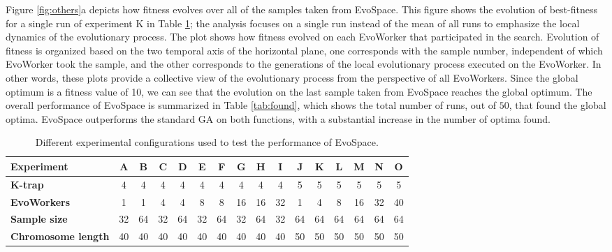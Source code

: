 Figure \ref{fig:others}a depicts how fitness evolves over all of the samples taken from EvoSpace.
This figure shows the evolution of best-fitness for a single run of experiment K in Table \ref{tab:exp};
the analysis focuses on a single run instead of the mean of all runs to emphasize the local dynamics of the evolutionary process.
The plot shows how fitness evolved on each EvoWorker that participated in the search.
Evolution of fitness is organized based on the two temporal axis of the horizontal plane,
one corresponds with the sample number, independent of which EvoWorker took the sample, and the other corresponds
to the generations of the local evolutionary process executed on the EvoWorker.
In other words, these plots provide a collective view of the evolutionary process from the perspective of all EvoWorkers.
Since the global optimum is a fitness value of 10, we can see that the evolution on the last sample taken from EvoSpace reaches the global optimum.
The overall performance of EvoSpace is summarized in Table \ref{tab:found}, which shows the total number of runs, out of $50$,
that found the global optima.
EvoSpace outperforms the standard GA on both functions, with a substantial increase in the number of optima found.

\begin{table}[t]
\caption{Different experimental configurations used to test the
  performance of EvoSpace.} %
\centering
\tiny
\begin{tabular}{|l||c|c|c|c|c|c|c|c|c|c|c|c|c|c|c|}
   \hline
             \textbf{Experiment} 	& A & B & C & D & E & F & G & H & I & J & K & L & M & N & O \\

   \hline
               \textbf{K-trap}   	& 4  & 4  & 4  & 4  & 4  & 4  & 4  & 4  & 4 & 5 & 5 & 5 & 5 & 5 & 5 \\
			   \textbf{EvoWorkers}  & 1  & 1  & 4  & 4  & 8  & 8  & 16 & 16 & 32 & 1 & 4 & 8 & 16 & 32 & 40 \\
			   \textbf{Sample size} & 32 & 64 & 32 & 64 & 32 & 64 & 32 & 64 & 32 & 64 & 64 & 64 & 64 & 64 & 64 \\
			   \textbf{Chromosome length} & 40 & 40 & 40 & 40 & 40 & 40 & 40 & 40 & 40 & 50 & 50 & 50 & 50 & 50 & 50 \\
   \hline
\end{tabular}
\label{tab:exp}
\end{table}


